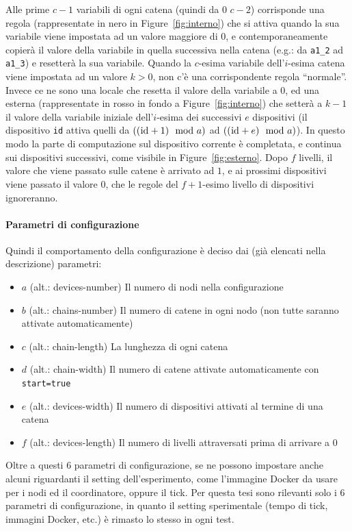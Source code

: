 \documentclass[target=bach]{thud}
\begin{document}
Alle prime $c-1$ variabili di ogni catena (quindi da $0$ $c-2$) corrisponde una regola (rappresentate in nero in Figure~\ref{fig:interno}) che si attiva quando la sua variabile viene impostata ad un valore maggiore di $0$, e contemporaneamente copierà il valore della variabile in quella successiva nella catena (e.g.: da \lstinline{a1_2} ad \lstinline{a1_3}) e resetterà la sua variabile.
Quando la $c$-esima variabile dell'$i$-esima catena viene impostata ad un valore $k>0$, non c'è una corrispondente regola ``normale''. Invece ce ne sono una locale che resetta il valore della variabile a $0$, ed una esterna (rappresentate in rosso in fondo a Figure~\ref{fig:interno}) che setterà a $k-1$ il valore della variabile iniziale dell'$i$-esima dei successivi $e$ dispositivi (il dispositivo \lstinline{id} attiva quelli da $((\text{\lstinline{id}}+1)\mod a)$ ad $((\text{\lstinline{id}}+e)\mod a)$). In questo modo la parte di computazione sul dispositivo corrente è completata, e continua sui dispositivi successivi, come visibile in Figure~\ref{fig:esterno}.
Dopo $f$ livelli, il valore che viene passato sulle catene è arrivato ad $1$, e ai prossimi dispositivi viene passato il valore $0$, che le regole del $f+1$-esimo livello di dispositivi ignoreranno.

\paragraph{Parametri di configurazione}

Quindi il comportamento della configurazione è deciso dai (già elencati nella descrizione) parametri:
\begin{itemize}
    \item $a$ (alt.: devices-number) Il numero di nodi nella configurazione
    \item $b$ (alt.: chains-number) Il numero di catene in ogni nodo (non tutte saranno attivate automaticamente)
    \item $c$ (alt.: chain-length) La lunghezza di ogni catena
    \item $d$ (alt.: chain-width) Il numero di catene attivate automaticamente con \lstinline{start=true}
    \item $e$ (alt.: devices-width) Il numero di dispositivi attivati al termine di una catena
    \item $f$ (alt.: devices-length) Il numero di livelli attraversati prima di arrivare a $0$
\end{itemize}

Oltre a questi 6 parametri di configurazione, se ne possono impostare anche alcuni riguardanti il setting dell'esperimento, come l'immagine Docker da usare per i nodi ed il coordinatore, oppure il tick.
Per questa tesi sono rilevanti solo i 6 parametri di configurazione, in quanto il setting sperimentale (tempo di tick, immagini Docker, etc.) è rimasto lo stesso in ogni test.
\end{document}
